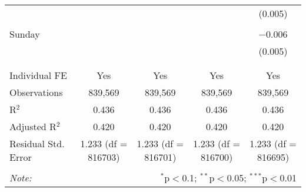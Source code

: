 \documentclass[
]{article}
\begin{document}
\begin{table}[!htbp]
{\begin{tabular}{@{\extracolsep{5pt}}lcccc}
  &  &  &  & (0.005) \\ 
  & & & & \\ 
 Sunday &  &  &  & $-$0.006 \\ 
  &  &  &  & (0.005) \\ 
  & & & & \\ 
\hline \\[-1.8ex] 
Individual FE & Yes & Yes & Yes & Yes \\ 
Observations & 839,569 & 839,569 & 839,569 & 839,569 \\ 
R$^{2}$ & 0.436 & 0.436 & 0.436 & 0.436 \\ 
Adjusted R$^{2}$ & 0.420 & 0.420 & 0.420 & 0.420 \\ 
Residual Std. Error & 1.233 (df = 816703) & 1.233 (df = 816701) & 1.233 (df = 816700) & 1.233 (df = 816695) \\ 
\hline 
\hline \\[-1.8ex] 
\textit{Note:}  & \multicolumn{4}{r}{$^{*}$p$<$0.1; $^{**}$p$<$0.05; $^{***}$p$<$0.01} \\ 
\end{tabular}
} 
\end{table} 
\newpage
\end{document}
